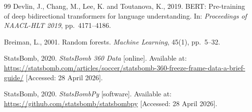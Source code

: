 \documentclass{article}
\begin{document}
\begin{thebibliography}{99}
Devlin, J., Chang, M., Lee, K. and Toutanova, K., 2019. BERT: Pre-training of deep bidirectional transformers for language understanding. In: \textit{Proceedings of NAACL-HLT 2019}, pp.\ 4171--4186.

Breiman, L., 2001. Random forests. \textit{Machine Learning}, 45(1), pp.\ 5--32.

StatsBomb, 2020. \textit{StatsBomb 360 Data} [online]. Available at: \url{https://statsbomb.com/articles/soccer/statsbomb-360-freeze-frame-data-a-brief-guide/} [Accessed: 28 April 2026].

StatsBomb, 2020. \textit{StatsBombPy} [software]. Available at: \url{https://github.com/statsbomb/statsbombpy} [Accessed: 28 April 2026].

\end{thebibliography}

\end{document}
